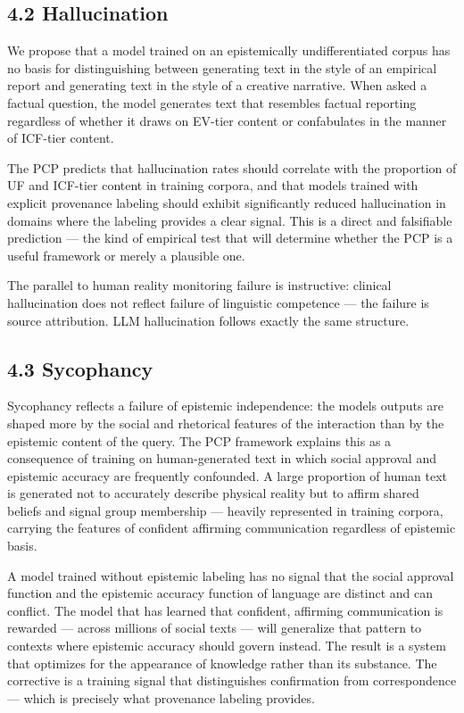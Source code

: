 \documentclass[
]{article}
\begin{document}
\subsection{4.2 Hallucination}\label{hallucination}

We propose that a model trained on an epistemically undifferentiated
corpus has no basis for distinguishing between generating text in the
style of an empirical report and generating text in the style of a
creative narrative. When asked a factual question, the model generates
text that resembles factual reporting regardless of whether it draws on
EV-tier content or confabulates in the manner of ICF-tier content.

The PCP predicts that hallucination rates should correlate with the
proportion of UF and ICF-tier content in training corpora, and that
models trained with explicit provenance labeling should exhibit
significantly reduced hallucination in domains where the labeling
provides a clear signal. This is a direct and falsifiable prediction ---
the kind of empirical test that will determine whether the PCP is a
useful framework or merely a plausible one.

The parallel to human reality monitoring failure is instructive:
clinical hallucination does not reflect failure of linguistic competence
--- the failure is source attribution. LLM hallucination follows exactly
the same structure.

\subsection{4.3 Sycophancy}\label{sycophancy}

Sycophancy reflects a failure of epistemic independence: the
model\textquotesingle s outputs are shaped more by the social and
rhetorical features of the interaction than by the epistemic content of
the query. The PCP framework explains this as a consequence of training
on human-generated text in which social approval and epistemic accuracy
are frequently confounded. A large proportion of human text is generated
not to accurately describe physical reality but to affirm shared beliefs
and signal group membership --- heavily represented in training corpora,
carrying the features of confident affirming communication regardless of
epistemic basis.

A model trained without epistemic labeling has no signal that the social
approval function and the epistemic accuracy function of language are
distinct and can conflict. The model that has learned that confident,
affirming communication is rewarded --- across millions of social texts
--- will generalize that pattern to contexts where epistemic accuracy
should govern instead. The result is a system that optimizes for the
appearance of knowledge rather than its substance. The corrective is a
training signal that distinguishes confirmation from correspondence ---
which is precisely what provenance labeling provides.
\end{document}
